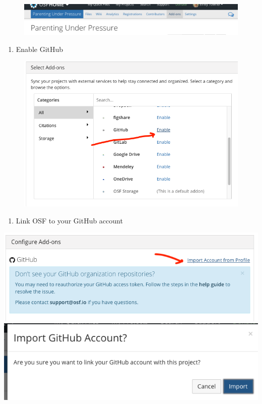 \documentclass[]{book}
\providecommand{\tightlist}{%
  \setlength{\itemsep}{0pt}\setlength{\parskip}{0pt}}
\begin{document}
\begin{figure}
\centering
\includegraphics{images/research_protocols/osf/3.png}
\caption{}
\end{figure}

\begin{enumerate}
\def\labelenumi{\arabic{enumi}.}
\setcounter{enumi}{3}
\tightlist
\item
  Enable GitHub
\end{enumerate}

\begin{figure}
\centering
\includegraphics{images/research_protocols/osf/4.png}
\caption{}
\end{figure}

\begin{enumerate}
\def\labelenumi{\arabic{enumi}.}
\setcounter{enumi}{4}
\tightlist
\item
  Link OSF to your GitHub account
\end{enumerate}

\includegraphics{images/research_protocols/osf/5.png}
\includegraphics{images/research_protocols/osf/6.png}
\end{document}
